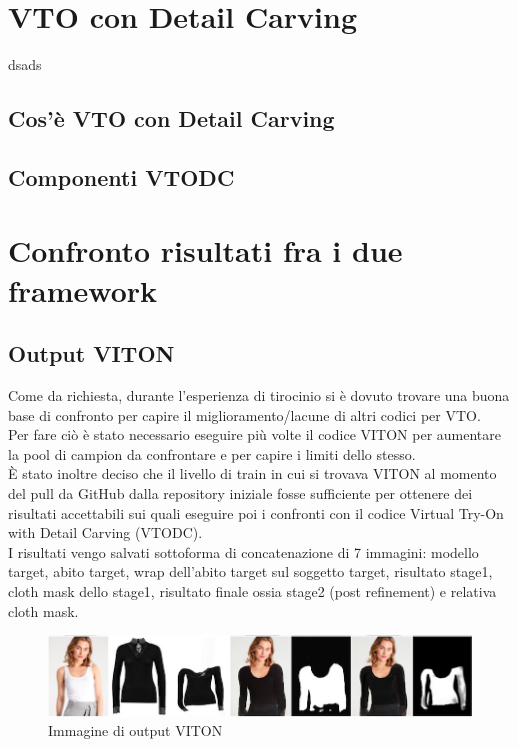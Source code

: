 \documentclass[final, 11pt]{article}
\begin{document}
	\section{VTO con Detail Carving}
	dsads
	\subsection{Cos'è VTO con Detail Carving}
	\subsection{Componenti VTODC}
	
	\newpage
	\section{Confronto risultati fra i due framework}
	\subsection{Output VITON}
	Come da richiesta, durante l'esperienza di tirocinio si è dovuto trovare una buona base di confronto per capire il miglioramento/lacune di altri codici per VTO.\\Per fare ciò è stato necessario eseguire più volte il codice VITON per aumentare la pool di campion da confrontare e per capire i limiti dello stesso.\\
	È stato inoltre deciso che il livello di train in cui si trovava VITON al momento del pull da GitHub dalla repository iniziale fosse sufficiente per ottenere dei risultati accettabili sui quali eseguire poi i confronti con il codice Virtual Try-On with Detail Carving (VTODC).\\
	
	I risultati vengo salvati sottoforma di concatenazione di 7 immagini: modello target, abito target, wrap dell'abito target sul soggetto target, risultato stage1, cloth mask dello stage1, risultato finale ossia stage2 (post refinement) e relativa cloth mask.
	
	\begin{figure}[!htb]
		\centering
		\includegraphics[width=\linewidth]{res_viton.png}
		\caption{Immagine di output VITON}
	\end{figure} 
	
\end{document}
